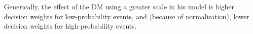 \documentclass[%
	11pt,
	abstract=true,	
	bibliography=oldstyle					%
]{scrartcl}
\newcommand{\ND}{\mathcal{N}} %
\numberwithin{equation}{section}
\begin{document}
%
%
%
%
%
%

Generically, the effect of the DM using a greater scale in his model is higher decision weights for low-probability events, and (because of normalisation), lower decision weights for high-probability events.
\end{document}
